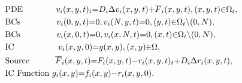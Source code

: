 \documentclass[\main/thesis.tex]{subfiles}
\begin{document}
\begin{align}
&\text{PDE } \hspace{0.5in}v_i(x, y, t)_t {=} D_i\Delta v_i(x, y, t) {+} \overline{F}_i(x, y, t), (x, y, t) {\in} \Omega_t,
\label{eq:carcin_pde_inhomo_v} \\
&\text{BCs } \hspace{0.55in}v_i(0, y, t) {=} 0, v_i(N, y, t) {=} 0, (y, t) {\in} \Omega_t {\setminus} (0, N),
\label{eq:bcs_homo_x} \\
&\text{BCs } \hspace{0.55in}v_i(x, 0, t) {=} 0, v_i(x, N, t) {=} 0, (x, t) {\in} \Omega_t {\setminus} (0, N),
\label{eq:bcs_homo_y} \\
&\text{IC } \hspace{0.68in}v_i(x, y, 0) {=} g(x, y), (x, y) {\in} \Omega,
\label{eq:ic_inhomo_v} \\
&\text{Source } \hspace{0.38in}\overline{F}_i(x, y, t) {=} F_i(x, y, t) {-} r_i(x, y, t)_t {+} D_i\Delta r_i(x, y, t),
\label{eq:source_term_v} \\
&\text{IC Function } g_i(x, y) {=} f_i(x, y) {-} r_i(x, y, 0).
\label{eq:ic_func_inhomo_v}
\end{align}
\end{document}
